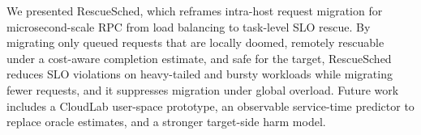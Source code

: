We presented RescueSched, which reframes intra-host request migration for
microsecond-scale RPC from load balancing to task-level SLO rescue. By
migrating only queued requests that are locally doomed, remotely
rescuable under a cost-aware completion estimate, and safe for the target,
RescueSched reduces SLO violations on heavy-tailed and bursty workloads
while migrating fewer requests, and it suppresses migration under global
overload. Future work includes a CloudLab user-space prototype, an
observable service-time predictor to replace oracle estimates, and a
stronger target-side harm model.